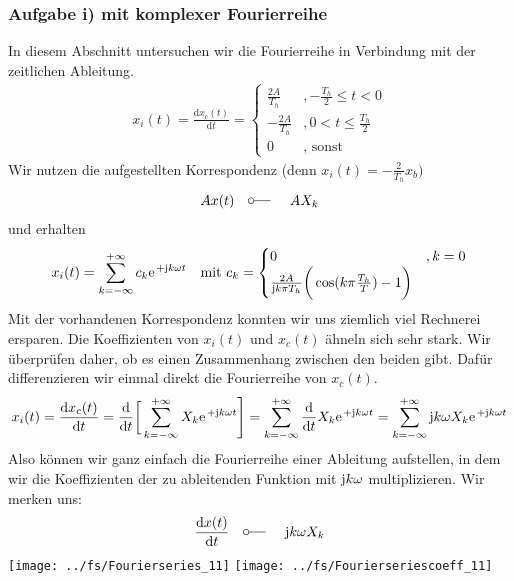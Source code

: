 \documentclass[11pt,a4paper,DIV=12]{scrartcl}
\newcommand{\diff}{\mathrm{d}}
\begin{document}
\subsubsection*{Aufgabe i) mit komplexer Fourierreihe}
In diesem Abschnitt untersuchen wir die Fourierreihe in Verbindung mit der zeitlichen Ableitung.
\begin{align}
	x_{i}(t)=\frac{\diff x_{c}(t)}{\diff t}=\begin{cases}
		\frac{2A}{T_h}&,-\frac{T_h}{2}\leq t < 0\\
		-\frac{2A}{T_h}&,0<t\leq \frac{T_h}{2} \\
		0&,\text{ sonst}
	\end{cases}
\end{align}
Wir nutzen die aufgestellten Korrespondenz (denn $x_{i}(t)=-\frac{2}{T_h}x_{b})$
\begin{gather}
	Ax(t)\quad\fourier\quad AX_{k}
\end{gather}
und erhalten
\begin{align}
	x_{i}(t)=\sum_{k=-\infty}^{+\infty}c_k\e^{+\im k \omega t}\quad\text{mit }c_k=\begin{cases}
	0&,k=0\\
	\frac{2A}{\im k\pi T_h}\bigg (\cos(k\pi\frac{T_h}{T})-1\bigg )
	\end{cases}
\end{align}
Mit der vorhandenen Korrespondenz konnten wir uns ziemlich viel Rechnerei ersparen. Die Koeffizienten von $x_{i}(t)$ und $x_{c}(t)$ ähneln sich sehr stark. Wir überprüfen daher, ob es einen Zusammenhang zwischen den beiden gibt. Dafür differenzieren wir einmal direkt die Fourierreihe von $x_{c}(t)$.
\begin{align}
	x_{i}(t)=\frac{\diff x_{c}(t)}{\diff t}=\frac{\diff }{\diff t}\bigg [\sum_{k=-\infty}^{+\infty}X_k\e^{+\im k \omega t}\Bigg ]=\sum_{k=-\infty}^{+\infty}\frac{\diff }{\diff t}X_k\e^{+\im k \omega t}=\sum_{k=-\infty}^{+\infty}\im k \omega X_k\e^{+\im k \omega t}
\end{align}
Also können wir ganz einfach die Fourierreihe einer Ableitung aufstellen, in dem wir die Koeffizienten der zu ableitenden Funktion mit $\im k \omega$ multiplizieren. Wir merken uns:
\begin{align}
	\frac{\diff x(t)}{\diff t}\quad\fourier\quad\im k \omega X_k
\end{align}
\newpage
\texttt{[image: ../fs/Fourierseries\_11]}
\texttt{[image: ../fs/Fourierseriescoeff\_11]}
\newpage
\end{document}

